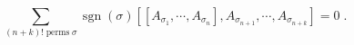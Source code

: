 \begin{equation}
\sum_{\left(  n+k\right)  !\;\text{perms}\;\sigma}\operatorname{sgn}\left(
\sigma\right)  \left[  \left[  A_{\sigma_{1}},\cdots,A_{\sigma_{n}}\right]
,A_{\sigma_{n+1}},\cdots,A_{\sigma_{n+k}}\right]  =0\;.
\end{equation}

